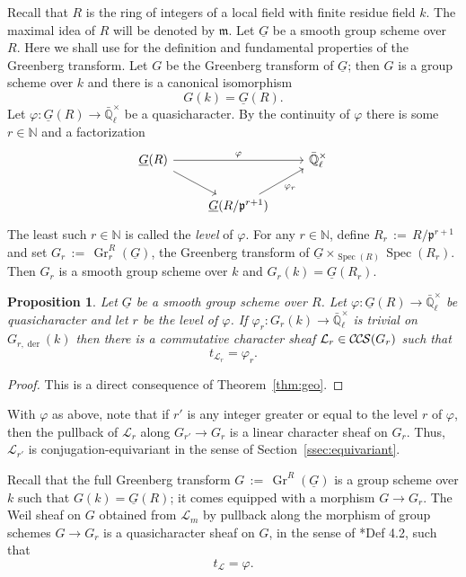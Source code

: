 \documentclass[10pt]{amsart}
\theoremstyle{plain}
\newtheorem{proposition}[theorem]{Proposition}
\theoremstyle{definition}
\newcommand{\NN}{{\mathbb{N}}}
\newcommand{\EE}{\mathbb{\bar Q}_\ell}
\newcommand{\Fq}{k}
\newcommand{\EEx}{\EE^\times}
\DeclareMathOperator{\Gr}{Gr}
\newcommand{\Spec}[1]{{\operatorname{Spec}(#1)}}
\newcommand{\ceq}{{\, :=\, }}
\newcommand{\trFrob}[1]{t_{#1}}
\newcommand{\cs}[1]{{\mathcal{#1}}}
\newcommand{\CCS}{{\mathcal{C\hskip-.8pt C\hskip-0.8pt S}}}
\begin{document}
Recall that $R$ is the ring of integers of a local field with finite residue field $k$.
The maximal idea of $R$ will be denoted by $\mathfrak{m}$. 
Let $\underline{G}$ be a smooth group scheme over $R$.
Here we shall use  \cite{bertapelle-gonzales:Greenberg} for the definition and fundamental properties of the Greenberg transform.
Let $G$ be the Greenberg transform of $\underline{G}$; then $G$ is a group scheme over $\Fq$ and there is a canonical isomorphism
\[
G(\Fq) = \underline{G}(R).
\]
Let $\varphi : \underline{G}(R) \to \EEx$ be a quasicharacter. 
By the continuity of $\varphi$ there is some $r \in \NN$ and a factorization
\[
\begin{tikzcd}
\underline{G}(R) \arrow{rr}{\varphi} \arrow{rd} && \EEx\\
& \underline{G}(R/\mathfrak{p}^{r+1}) \arrow{ru}[swap]{\varphi_r} 
\end{tikzcd}
\] 
The least such $r\in \NN$ is called the {\it level} of $\varphi$.
For any $r\in \NN$, define $R_r \ceq R/\mathfrak{p}^{r+1}$ and
set $G_r \ceq \Gr_r^{R}(\underline{G})$, the Greenberg transform of $\underline{G}\times_{\Spec{R}}\Spec{R_r}$.
Then $G_r$ is a smooth group scheme over $\Fq$ and $G_r(\Fq) = \underline{G}(R_r)$.

\begin{proposition}\label{prop:quasicharacters}
Let $\underline{G}$ be a smooth group scheme over $R$.
Let $\varphi : \underline{G}(R) \to \EEx$ be quasicharacter and let $r$ be the level of $\varphi$.
If $\varphi_r : G_r(k)\to \EEx$ is trivial on $G_{r,\operatorname{der}}(k)$ then 
there is a commutative character sheaf $\cs{L}_r\in \CCS(G_r)$ such that 
\[
\trFrob{\cs{L}_r} =  \varphi_r.
\] 
\end{proposition}

\begin{proof}
This is a direct consequence of Theorem~\ref{thm:geo}.
\end{proof}

With $\varphi$ as above, note that if $r'$ is any integer greater or equal to the level $r$ of $\varphi$, then the pullback of $\cs{L}_r$ along $G_{r'} \to G_{r}$ is a linear character sheaf on $G_r$. 
Thus, $\cs{L}_{r'}$ is conjugation-equivariant in the sense of Section~\ref{ssec:equivariant}.

Recall that the full Greenberg transform $G \ceq \Gr^{R}(\underline{G})$ is a group scheme over $\Fq$ such that $G(\Fq) = \underline{G}(R)$; it comes equipped with a morphism $G \to G_r$.
The Weil sheaf on $G$ obtained from $\cs{L}_m$ by pullback along the morphism of group schemes $G \to G_r$ is a quasicharacter sheaf on $G$, in the sense of \cite{cunningham-roe:13a}*{Def 4.2}, such that 
\[
\trFrob{\cs{L}} = \varphi.
\]
\end{document}
